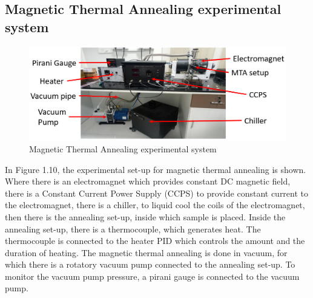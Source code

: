 \subsection{Magnetic Thermal Annealing experimental system}
\begin{figure}[H]
	\centering
   \includegraphics[scale=0.56]{Images/27.png} 
   \caption{Magnetic Thermal Annealing experimental system}
\end{figure}
In Figure 1.10, the experimental set-up for magnetic thermal annealing is shown. Where there is an electromagnet which provides constant DC magnetic field, there is a Constant Current Power Supply (CCPS) to provide constant current to the electromagnet, there is a chiller, to liquid cool the coils of the electromagnet, then there is the annealing set-up, inside which sample is placed. Inside the annealing set-up, there is a thermocouple, which generates heat. The thermocouple is connected to the heater PID which controls the amount and the duration of heating. The magnetic thermal annealing is done in vacuum, for which there is a rotatory vacuum pump connected to the annealing set-up. To monitor the vacuum pump pressure, a pirani gauge is connected to the vacuum pump.    
